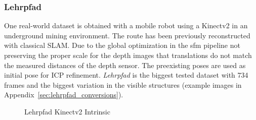 \subsubsection{Lehrpfad}

One real-world dataset is obtained with a mobile robot using a Kinectv2 in an underground mining environment.
The route has been previously reconstructed with classical SLAM.
Due to the global optimization in the \gls{sfm} pipeline not preserving the proper scale for the depth images that translations do not match the measured distances of the depth sensor.
The preexisting poses are used as initial pose for ICP refinement.
\emph{Lehrpfad} is the biggest tested dataset with 734 frames and the biggest variation in the visible structures (example images in Appendix~\ref{sec:lehrpfad_conversions}).
\begin{figure}[H]
\CenterFloatBoxes%
\begin{floatrow}
    {\caption{Lehrpfad Kinectv2 Intrinsic}\label{tab:lehrpfad_intrinsic}}%
\end{floatrow}
\end{figure}

